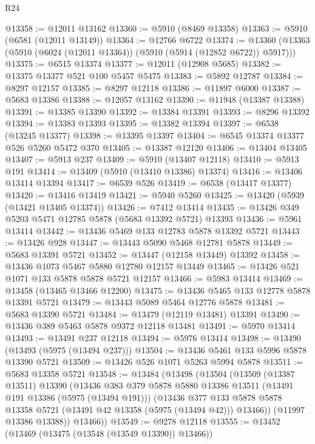 \begin{lexlean}{R24}
\begin{coremodule}
@13358 := @12011 @13162
@13360 := @5910 (@8469 @13358)
@13363 := @5910 (@6581 (@12011 @13149))
@13364 := @12766 @6722
@13374 := @13360 (@13363 (@5910 (@6024 (@12011 @13364)) (@5910 (@5914 (@12852 @6722)) @5917)))
@13375 := @6515 @13374
@13377 := @12011 (@12908 @5685)
@13382 := @13375 @13377 @521 @100 @5457 @5475
@13383 := @5892 @12787
@13384 := @8297 @12157
@13385 := @8297 @12118
@13386 := @11897 @6000
@13387 := @5683 @13386
@13388 := @12057 @13162
@13390 := @11948 (@13387 @13388)
@13391 := @13385 @13390
@13392 := @13384 @13391
@13393 := @8296 @13392
@13394 := @13383 @13393
@13395 := @13382 @13394
@13397 := @6538 (@13245 @13377)
@13398 := @13395 @13397
@13404 := @6545 @13374 @13377 @526 @5260 @5472 @370
@13405 := @13387 @12120
@13406 := @13404 @13405
@13407 := @5913 @237
@13409 := @5910 (@13407 @12118)
@13410 := @5913 @191
@13414 := @13409 (@5910 (@13410 @13386) @13374)
@13416 := @13406 @13414 @13394
@13417 := @6539 @526
@13419 := @6538 (@13417 @13377)
@13420 := @13416 @13419
@13421 := @5940 @5260
@13425 := @13420 (@5939 (@13421 @13405 @13374))
@13426 := @7412 @13414
@13435 := @13426 @349 @5203 @5471 @12785 @5878 (@5683 @13392 @5721) @13393
@13436 := @5961 @13414
@13442 := @13436 @5469 @133 @12783 @5878 @13392 @5721
@13443 := @13426 @928
@13447 := @13443 @5090 @5468 @12781 @5878
@13449 := @5683 @13391 @5721
@13452 := @13447 (@12158 @13449) @13392
@13458 := @13436 @1073 @5467 @5880 @12780 @12157 @13449
@13465 := @13426 @521 @1071 @133 @5878 @5878 @5721 @12157
@13466 := @5983 @13414
@13469 := @13458 (@13465 @13466 @12200)
@13475 := @13436 @5465 @133 @12778 @5878 @13391 @5721
@13479 := @13443 @5089 @5464 @12776 @5878
@13481 := @5683 @13390 @5721
@13484 := @13479 (@12119 @13481) @13391
@13490 := @13436 @389 @5463 @5878 @9372 @12118 @13481
@13491 := @5970 @13414
@13493 := @13491 @237 @12118
@13494 := @5976 @13414
@13498 := @13490 (@13493 (@5975 (@13494 @237)))
@13504 := @13436 @5461 @133 @5996 @5878 @13390 @5721
@13509 := @13426 @526 @1071 @5263 @5994 @5878
@13511 := @5683 @13358 @5721
@13548 := @13484
    (@13498
      (@13504
        (@13509
          (@13387 @13511)
          @13390
          (@13436
            @383
            @379
            @5878
            @5880
            @13386
            @13511
            (@13491 @191 @13386 (@5975 (@13494 @191)))
            (@13436
              @377
              @133
              @5878
              @5878
              @13358
              @5721
              (@13491 @42 @13358 (@5975 (@13494 @42)))
              @13466))
          (@11997 @13386 @13388))
        @13466))
@13549 := @9278 @12118
@13555 := @13452 (@13469 (@13475 (@13548 (@13549 @13390)) @13466))

\end{coremodule}
\end{lexlean}
